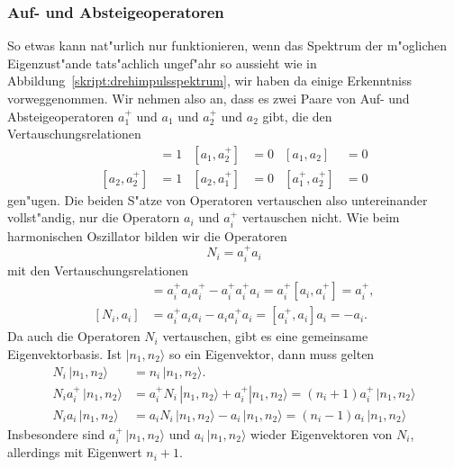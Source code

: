 \subsubsection{Auf- und Absteigeoperatoren}
So etwas kann nat"urlich nur funktionieren, wenn das Spektrum der
m"oglichen Eigenzust"ande tats"achlich ungef"ahr so aussieht wie in
Abbildung~\ref{skript:drehimpulsspektrum}, wir haben da einige Erkenntniss
vorweggenommen.
Wir nehmen also an, dass es zwei Paare von Auf- und Absteigeoperatoren
$a_1^+$ und $a_1$ und $a_2^+$ und $a_2$ gibt, die den Vertauschungsrelationen
\begin{align*}
[a_1,a_1^+]&=1&[a_1,a_2^+]&=0&[a_1,a_2]&=0\\
[a_2,a_2^+]&=1&[a_2,a_1^+]&=0&[a_1^+,a_2^+]&=0
\end{align*}
gen"ugen.
Die beiden S"atze von Operatoren vertauschen also untereinander
vollst"andig, nur die Operatorn $a_i$ und $a_i^+$ vertauschen nicht.
Wie beim harmonischen Oszillator bilden wir die Operatoren
\[
N_i=a_i^+a_i
\]
mit den Vertauschungsrelationen
\begin{align*}
[N_i,a_i^+]
&=
a_i^+a_ia_i^+-a_i^+a_i^+a_i
=
a_i^+[a_i,a_i^+]
=
a_i^+,
\\
[N_i,a_i]
&=
a_i^+a_ia_i- a_ia_i^+a_i
=
[a_i^+,a_i]a_i
=
-a_i.
\end{align*}
Da auch die Operatoren $N_i$ vertauschen, gibt es eine gemeinsame
Eigenvektorbasis. Ist $|n_1,n_2\rangle$ so ein Eigenvektor, dann muss
gelten
\begin{align*}
N_i\,|n_1,n_2\rangle
&=
n_i\,|n_1,n_2\rangle.
\\
N_ia_i^+\,|n_1,n_2\rangle
&=
a_i^+N_i\,|n_1,n_2\rangle+a_i^+|n_1,n_2\rangle
=
(n_i+1)a_i^+\,|n_1,n_2\rangle
\\
N_ia_i\,|n_1,n_2\rangle
&=
a_iN_i\,|n_1,n_2\rangle-a_i\,|n_1,n_2\rangle
=
(n_i-1)a_i\,|n_1,n_2\rangle
\end{align*}
Insbesondere sind $a_i^+\,|n_1,n_2\rangle$ und $a_i\,|n_1,n_2\rangle$
wieder Eigenvektoren von $N_i$, allerdings mit Eigenwert $n_i+1$.

